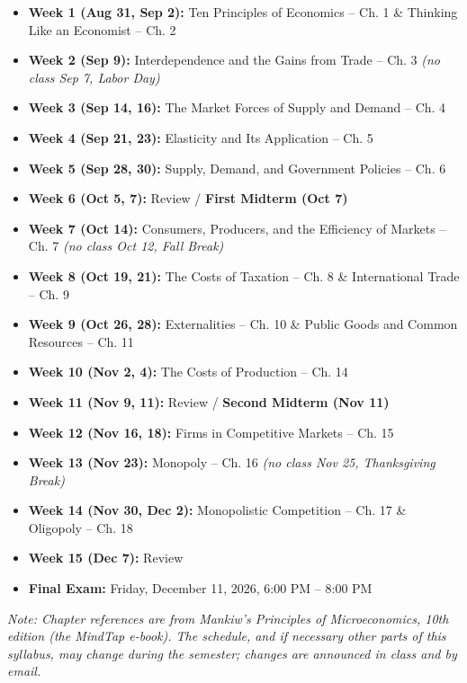 \documentclass[11pt,letterpaper]{article}
\newcommand{\finaltime}{Friday, December 11, 2026, 6:00 PM -- 8:00 PM}
\newcommand{\finaltime}{Friday, December 11, 2026, 8:00 AM -- 10:00 AM}
\begin{document}
\begin{itemize}
    \item \textbf{Week 1 (Aug 31, Sep 2):} Ten Principles of Economics – Ch. 1 \& Thinking Like an Economist – Ch. 2
    \item \textbf{Week 2 (Sep 9):} Interdependence and the Gains from Trade – Ch. 3 \textit{(no class Sep 7, Labor Day)}
    \item \textbf{Week 3 (Sep 14, 16):} The Market Forces of Supply and Demand – Ch. 4
    \item \textbf{Week 4 (Sep 21, 23):} Elasticity and Its Application – Ch. 5
    \item \textbf{Week 5 (Sep 28, 30):} Supply, Demand, and Government Policies – Ch. 6
    \item \textbf{Week 6 (Oct 5, 7):} Review / \textbf{First Midterm (Oct 7)}
    \item \textbf{Week 7 (Oct 14):} Consumers, Producers, and the Efficiency of Markets – Ch. 7 \textit{(no class Oct 12, Fall Break)}
    \item \textbf{Week 8 (Oct 19, 21):} The Costs of Taxation – Ch. 8 \& International Trade – Ch. 9
    \item \textbf{Week 9 (Oct 26, 28):} Externalities – Ch. 10 \& Public Goods and Common Resources – Ch. 11
    \item \textbf{Week 10 (Nov 2, 4):} The Costs of Production – Ch. 14
    \item \textbf{Week 11 (Nov 9, 11):} Review / \textbf{Second Midterm (Nov 11)}
    \item \textbf{Week 12 (Nov 16, 18):} Firms in Competitive Markets – Ch. 15
    \item \textbf{Week 13 (Nov 23):} Monopoly – Ch. 16 \textit{(no class Nov 25, Thanksgiving Break)}
    \item \textbf{Week 14 (Nov 30, Dec 2):} Monopolistic Competition – Ch. 17 \& Oligopoly – Ch. 18
    \item \textbf{Week 15 (Dec 7):} Review
    \item \textbf{Final Exam:} \finaltime
\end{itemize}

\textit{Note: Chapter references are from Mankiw's \textit{Principles of Microeconomics}, 10th edition (the MindTap e-book). The schedule, and if necessary other parts of this syllabus, may change during the semester; changes are announced in class and by email.}
\end{document}
